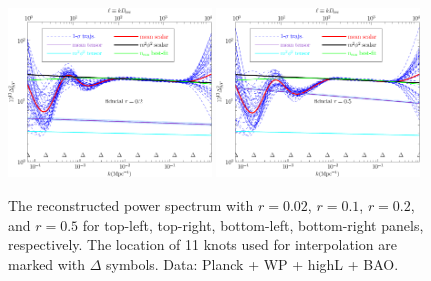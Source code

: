 \documentclass[11pt]{article}
\def \halffigwidth{0.48\textwidth}
\begin{document}
\begin{figure}
  \includegraphics[width=\halffigwidth]{nobicep_spline0_p11_r0d2_power_traj.pdf}%
  \includegraphics[width=\halffigwidth]{nobicep_spline0_p11_r0d5_power_traj.pdf}
  \caption{The reconstructed power spectrum with $r = 0.02$, $r=0.1$, $r=0.2$, and $r=0.5$ for top-left, top-right, bottom-left, bottom-right panels, respectively. The location of 11 knots used for interpolation are marked with $\Delta$ symbols. Data: Planck + WP + highL + BAO. }
\end{figure}
\end{document}
